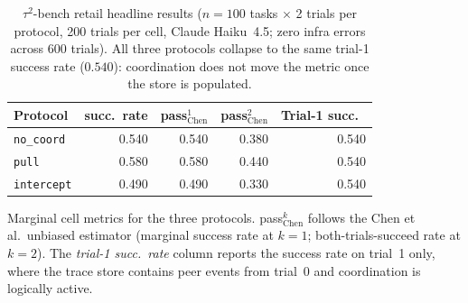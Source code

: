 \begin{table}[t]
\centering
\caption{$\tau^2$-bench retail headline results
($n=100$ tasks $\times$ 2 trials per protocol, 200 trials per
cell, Claude Haiku~4.5; zero infra errors across 600 trials).
All three protocols collapse to the same trial-1 success rate
($0.540$): coordination does not move the metric once the store
is populated.}
\label{tab:tau2retail:headline}
\small
\begin{tabular}{lrrrr}
\toprule
Protocol & succ.\ rate & pass$^1_{\mathrm{Chen}}$ & pass$^2_{\mathrm{Chen}}$ & Trial-1 succ.\ \\
\midrule
\texttt{no\_coord}  & 0.540 & 0.540 & 0.380 & 0.540 \\
\texttt{pull}       & 0.580 & 0.580 & 0.440 & 0.540 \\
\texttt{intercept}  & 0.490 & 0.490 & 0.330 & 0.540 \\
\bottomrule
\end{tabular}
\flushleft\footnotesize
Marginal cell metrics for the three protocols.
pass$^k_{\mathrm{Chen}}$ follows the Chen et al.\ unbiased
estimator (marginal success rate at $k{=}1$; both-trials-succeed
rate at $k{=}2$).  The \emph{trial-1 succ.\ rate} column reports
the success rate on trial~1 only, where the trace store contains
peer events from trial~0 and coordination is logically active.
\end{table}

